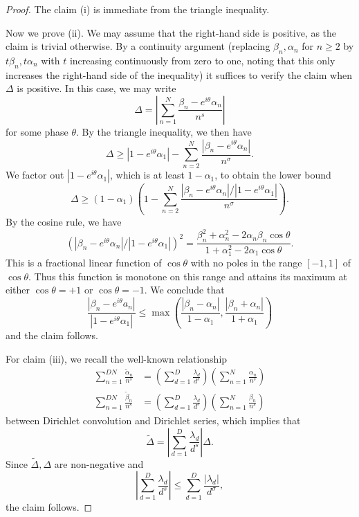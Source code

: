 \begin{proof}  The claim (i) is immediate from the triangle inequality.

Now we prove (ii).  We may assume that the right-hand side is positive, as the claim is trivial otherwise.  By a continuity argument (replacing $\beta_n,\alpha_n$ for $n \geq 2$ by $t \beta_n, t \alpha_n$ with $t$ increasing continuously from zero to one, noting that this only increases the right-hand side of the inequality) it suffices to verify the claim when $\Delta$ is positive.  In this case, we may write
$$ \Delta = \left|\sum_{n=1}^N \frac{\beta_n - e^{i\theta} \alpha_n}{n^s}\right|$$
for some phase $\theta$.   By the triangle inequality, we then have
$$ \Delta \geq |1 - e^{i\theta} \alpha_1| - \sum_{n=2}^N \frac{|\beta_n - e^{i\theta} \alpha_n|}{n^\sigma}.$$
We factor out $|1 - e^{i\theta} \alpha_1|$, which is at least $1-\alpha_1$, to obtain the lower bound
$$ \Delta \geq  (1-\alpha_1) \left(1 - \sum_{n=2}^N \frac{|\beta_n - e^{i\theta} \alpha_n| / |1 - e^{i\theta} \alpha_1|}{n^\sigma}\right).$$
By the cosine rule, we have
$$ \left(|\beta_n - e^{i\theta} \alpha_n| / |1 - e^{i\theta} \alpha_1|\right)^2 = \frac{\beta_n^2 + \alpha_n^2 - 2 \alpha_n \beta_n \cos \theta}{1 + \alpha_1^2 -2 \alpha_1 \cos \theta}.$$
This is a fractional linear function of $\cos \theta$ with no poles in the range $[-1,1]$ of $\cos \theta$.  Thus this function is monotone on this range and attains its maximum at either $\cos \theta=+1$ or $\cos \theta = -1$.  We conclude that
$$ \frac{|\beta_n - e^{i\theta} a_n|}{|1 - e^{i\theta} \alpha_1|} \leq \max( \frac{|\beta_n-\alpha_n|}{1-\alpha_1}, \frac{|\beta_n+\alpha_n|}{1+\alpha_1} )$$
and the claim follows.

For claim (iii), we recall the well-known relationship 
\begin{align*}
\sum_{n=1}^{DN} \frac{\tilde \alpha_n}{n^s} &= \left(\sum_{d=1}^{D} \frac{\lambda_d}{d^s}\right) \left(\sum_{n=1}^{N} \frac{\alpha_n}{n^s}\right)\\
\sum_{n=1}^{DN} \frac{\tilde \beta_n}{n^s} &= \left(\sum_{d=1}^{D} \frac{\lambda_d}{d^s}\right) \left(\sum_{n=1}^{N} \frac{\beta_n}{n^s}\right)
\end{align*}
between Dirichlet convolution and Dirichlet series, which implies that
$$ \tilde \Delta = \left|\sum_{d=1}^{D} \frac{\lambda_d}{d^s}\right| \Delta.$$
Since $\tilde \Delta,\Delta$ are non-negative and 
$$ \left|\sum_{d=1}^{D} \frac{\lambda_d}{d^s}\right| \leq \sum_{d=1}^D \frac{|\lambda_d|}{d^\sigma},$$
the claim follows.
\end{proof}

